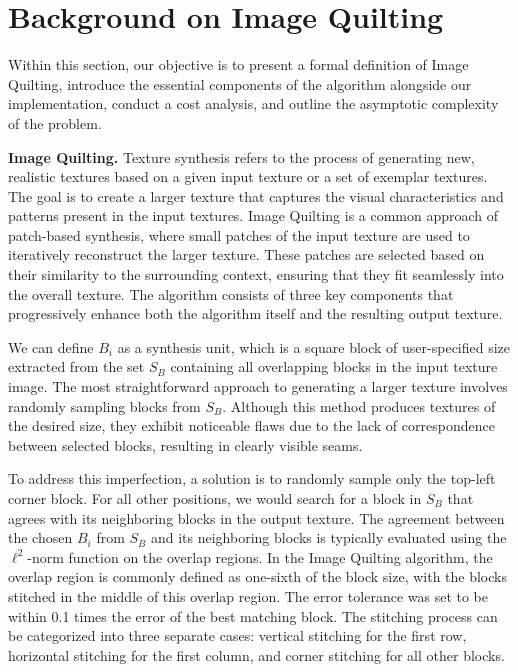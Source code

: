\documentclass[letterpaper]{article}
\newcommand{\mypar}[1]{{\bf #1.}}
\begin{document}
\section{Background on Image Quilting}\label{sec:background}

Within this section, our objective is to present a formal definition of Image Quilting, introduce the essential components of the algorithm alongside our implementation, conduct a cost analysis, and outline the asymptotic complexity of the problem.

\mypar{Image Quilting}
Texture synthesis refers to the process of generating new, realistic textures based on a given input texture or a set of exemplar textures. The goal is to create a larger texture that captures the visual characteristics and patterns present in the input textures.
Image Quilting is a common approach of patch-based synthesis, where small patches of the input texture are used to iteratively reconstruct the larger texture. These patches are selected based on their similarity to the surrounding context, ensuring that they fit seamlessly into the overall texture. The algorithm consists of three key components that progressively enhance both the algorithm itself and the resulting output texture.

We can define \textit{$B_{i}$} as a synthesis unit, which is a square block of user-specified size extracted from the set \textit{$S_{B}$} containing all overlapping blocks in the input texture image. The most straightforward approach to generating a larger texture involves randomly sampling blocks from \textit{$S_{B}$}. Although this method produces textures of the desired size, they exhibit noticeable flaws due to the lack of correspondence between selected blocks, resulting in clearly visible seams.

To address this imperfection, a solution is to randomly sample only the top-left corner block. For all other positions, we would search for a block in \textit{$S_{B}$} that agrees with its neighboring blocks in the output texture. The agreement between the chosen \textit{$B_{i}$} from \textit{$S_{B}$} and its neighboring blocks is typically evaluated using the $\ell ^2$-norm function on the overlap regions. In the Image Quilting algorithm, the overlap region is commonly defined as one-sixth of the block size, with the blocks stitched in the middle of this overlap region. The error tolerance was set to be within 0.1 times the error of the best matching block. The stitching process can be categorized into three separate cases: vertical stitching for the first row, horizontal stitching for the first column, and corner stitching for all other blocks.
\end{document}
